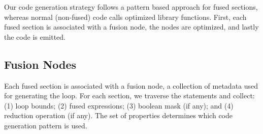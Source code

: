 Our code generation strategy follows a pattern based approach for fused sections,
whereas normal (non-fused) code calls optimized library functions. First, each fused section
is associated with a fusion node, the nodes are optimized, and lastly the code
is emitted.


\subsection{Fusion Nodes}

Each fused section is associated with a fusion node, a collection of metadata used
for generating the loop. For each section, we traverse the statements and collect:
(1) loop bounds; (2) fused expressions; (3) boolean mask (if any); and (4) reduction
operation (if any). The set of properties determines which code generation pattern
is used.





